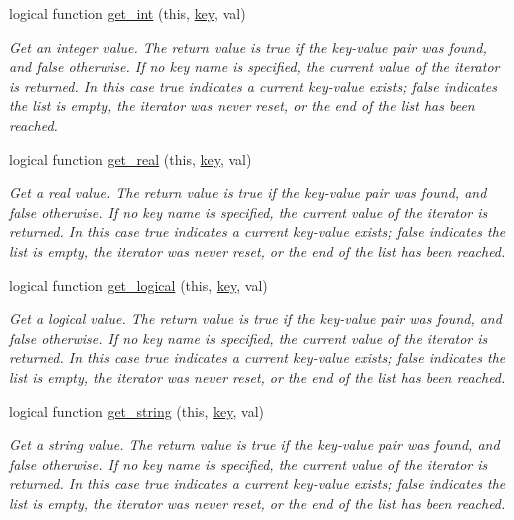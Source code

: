 \begin{DoxyCompactItemize}
logical function \mbox{\hyperlink{namespacepmc__property_addbb73ff876bf02aac23350fab5755fd}{get\+\_\+int}} (this, \mbox{\hyperlink{namespacepmc__property_a733aef8cbd02fbfed19bde913728678e}{key}}, val)
\begin{DoxyCompactList}\small\item\em Get an integer value. The return value is true if the key-\/value pair was found, and false otherwise. If no key name is specified, the current value of the iterator is returned. In this case true indicates a current key-\/value exists; false indicates the list is empty, the iterator was never reset, or the end of the list has been reached. \end{DoxyCompactList}\item 
logical function \mbox{\hyperlink{namespacepmc__property_a97cfe3c7d68a01b1aa164bb25b306a3b}{get\+\_\+real}} (this, \mbox{\hyperlink{namespacepmc__property_a733aef8cbd02fbfed19bde913728678e}{key}}, val)
\begin{DoxyCompactList}\small\item\em Get a real value. The return value is true if the key-\/value pair was found, and false otherwise. If no key name is specified, the current value of the iterator is returned. In this case true indicates a current key-\/value exists; false indicates the list is empty, the iterator was never reset, or the end of the list has been reached. \end{DoxyCompactList}\item 
logical function \mbox{\hyperlink{namespacepmc__property_a3c3246efe31f72428ecc4d3c6b72304a}{get\+\_\+logical}} (this, \mbox{\hyperlink{namespacepmc__property_a733aef8cbd02fbfed19bde913728678e}{key}}, val)
\begin{DoxyCompactList}\small\item\em Get a logical value. The return value is true if the key-\/value pair was found, and false otherwise. If no key name is specified, the current value of the iterator is returned. In this case true indicates a current key-\/value exists; false indicates the list is empty, the iterator was never reset, or the end of the list has been reached. \end{DoxyCompactList}\item 
logical function \mbox{\hyperlink{namespacepmc__property_a24b01526021e6f86df84ced42994bdf8}{get\+\_\+string}} (this, \mbox{\hyperlink{namespacepmc__property_a733aef8cbd02fbfed19bde913728678e}{key}}, val)
\begin{DoxyCompactList}\small\item\em Get a string value. The return value is true if the key-\/value pair was found, and false otherwise. If no key name is specified, the current value of the iterator is returned. In this case true indicates a current key-\/value exists; false indicates the list is empty, the iterator was never reset, or the end of the list has been reached. \end{DoxyCompactList}\item 

\end{DoxyCompactItemize}
